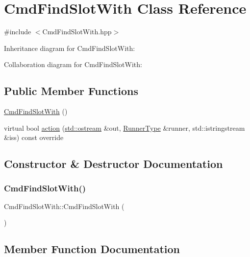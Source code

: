 \hypertarget{classCmdFindSlotWith}{}\section{Cmd\+Find\+Slot\+With Class Reference}
\label{classCmdFindSlotWith}


{\ttfamily \#include $<$Cmd\+Find\+Slot\+With.\+hpp$>$}



Inheritance diagram for Cmd\+Find\+Slot\+With\+:


Collaboration diagram for Cmd\+Find\+Slot\+With\+:
\subsection*{Public Member Functions}
\begin{DoxyCompactItemize}
\item 
\hyperlink{classCmdFindSlotWith_afdbed0612a863d8226156975adef63fe}{Cmd\+Find\+Slot\+With} ()
\item 
virtual bool \hyperlink{classCmdFindSlotWith_a0889715eef40b0c204fd97fef5050894}{action} (\hyperlink{doctest_8h_a116af65cb5e924b33ad9d9ecd7a783f3}{std\+::ostream} \&out, \hyperlink{Command_8hpp_ad45c3de597c2023a8be0399d914161f4}{Runner\+Type} \&runner, std\+::istringstream \&iss) const override
\end{DoxyCompactItemize}


\subsection{Constructor \& Destructor Documentation}
\mbox{\label{classCmdFindSlotWith_afdbed0612a863d8226156975adef63fe}} 
\subsubsection{\texorpdfstring{Cmd\+Find\+Slot\+With()}{CmdFindSlotWith()}}
{\footnotesize\ttfamily Cmd\+Find\+Slot\+With\+::\+Cmd\+Find\+Slot\+With (\begin{DoxyParamCaption}{ }\end{DoxyParamCaption})}



\subsection{Member Function Documentation}
\mbox{\label{classCmdFindSlotWith_a0889715eef40b0c204fd97fef5050894}} 
